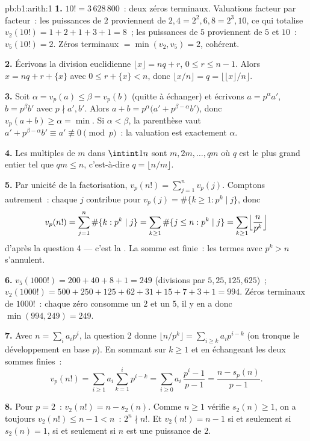 \begin{solution}{pb:b1:arith:1}
\textbf{1.} $10! = 3\,628\,800$~: deux zéros terminaux. Valuations
facteur par facteur~: les puissances de $2$ proviennent de $2, 4 = 2^2, 6, 8 = 2^3,
10$, ce qui totalise $v_2(10!) = 1 + 2 + 1 + 3 + 1 = 8$~; les puissances de $5$
proviennent de $5$ et $10$~: $v_5(10!) = 2$. Zéros terminaux $=
\min(v_2, v_5) = 2$, cohérent.

\textbf{2.} Écrivons la division euclidienne $\lfloor x\rfloor = nq +
r$, $0 \leq r \leq n - 1$. Alors $x = nq + r + \{x\}$ avec $0 \leq
r + \{x\} < n$, donc $\lfloor x/n \rfloor = q = \bigl\lfloor \lfloor
x \rfloor / n \bigr\rfloor$.

\textbf{3.} Soit $\alpha = v_p(a) \leq \beta = v_p(b)$ (quitte à échanger)
et écrivons $a = p^\alpha a'$, $b = p^\beta b'$ avec $p
\nmid a', b'$. Alors $a + b = p^\alpha\bigl(a' + p^{\beta -
\alpha}b'\bigr)$, donc $v_p(a + b) \geq \alpha = \min$. Si $\alpha <
\beta$, la parenthèse vaut $a' + p^{\beta-\alpha}b' \equiv a'
\not\equiv 0 \pmod p$~: la valuation est exactement $\alpha$.

\textbf{4.} Les multiples de $m$ dans $\intint1n$ sont $m, 2m, \dots,
qm$ où $q$ est le plus grand entier tel que $qm \leq n$, c'est-à-dire $q =
\lfloor n/m \rfloor$.

\textbf{5.} Par unicité de la factorisation, $v_p(n!) = \sum_{j=1}^{n}
v_p(j)$. Comptons autrement~: chaque $j$ contribue pour $v_p(j) =
\#\{k \geq 1 : p^k \mid j\}$, donc
\[
v_p(n!) = \sum_{j=1}^n \#\{k : p^k \mid j\}
= \sum_{k\geq1} \#\{j \leq n : p^k \mid j\}
= \sum_{k\geq1} \Bigl\lfloor \frac n{p^k} \Bigr\rfloor
\]
d'après la question 4 --- c'est la . La somme est finie~: les termes
avec $p^k > n$ s'annulent.

\textbf{6.} $v_5(1000!) = 200 + 40 + 8 + 1 = 249$ (divisions par
$5, 25, 125, 625$)~; $v_2(1000!) = 500 + 250 + 125 + 62 + 31 + 15 +
7 + 3 + 1 = 994$. Zéros terminaux de $1000!$~: chaque zéro consomme
un $2$ et un $5$, il y en a donc $\min(994, 249) = 249$.

\textbf{7.} Avec $n = \sum_i a_ip^i$, la question 2 donne $\lfloor
n/p^k \rfloor = \sum_{i \geq k} a_ip^{i-k}$ (on tronque le développement
en base $p$). En sommant sur $k \geq 1$ et en échangeant les deux sommes
finies~:
\[
v_p(n!) = \sum_{i\geq1} a_i \sum_{k=1}^{i} p^{i-k}
= \sum_{i\geq0} a_i\,\frac{p^i - 1}{p - 1}
= \frac{n - s_p(n)}{p - 1} .
\]

\textbf{8.} Pour $p = 2$~: $v_2(n!) = n - s_2(n)$. Comme $n \geq 1$
vérifie $s_2(n) \geq 1$, on a toujours $v_2(n!) \leq n - 1 < n$~: $2^n \nmid
n!$. Et $v_2(n!) = n - 1$ si et seulement si $s_2(n) = 1$, si et seulement si $n$ est une puissance
de $2$.


\end{solution}

